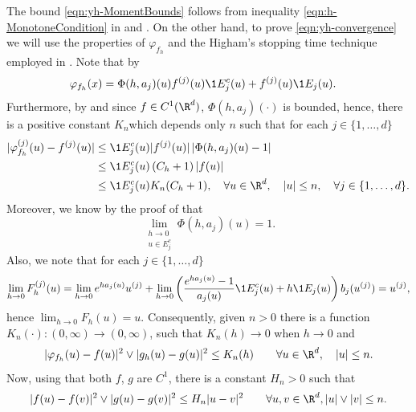 \documentclass[sort&compress, preprint]{elsarticle}
\theoremstyle{definition}
\theoremstyle{plain}%
\theoremstyle{remark}
\begin{document}
\begin{pf}
	The bound \eqref{eqn:yh-MomentBounds} follows from inequality \eqref{eqn:h-MonotoneCondition} in
	 and .
	On the other hand, to prove \eqref{eqn:yh-convergence} we will use the properties of 
	$\varphi_{f_h}$ and the Higham's stopping time technique employed in \cite[Thm 2.2]{Higham2002b}. 
	Note that by  
	\begin{align*}
		\varphi_{f_h}(x) 
			&= \Phi(h,a_j)(u) f^{(j)}(u) \1{E_j^c}(u) 
				+ f^{(j)}(u) \1{E_j}(u).
	\end{align*}
	Furthermore, by   and since $f \in C^1(\R^d)$,   $\Phi(h,a_j)(\cdot)$ is bounded,
	hence, there is a positive constant $K_n$which depends only $n$ such that for each $j\in \{1,\dots, d\}$
	\begin{align*}	
		|\varphi_{f_h}^{(j)}(u) - f^{(j)}(u)|
		&\leq
			\1{E_j^c}(u)
			|f^{(j)}(u)|
			\left|
				\Phi(h,a_j)(u) - 1
			\right| \notag \\
		&\leq
			\1{E_j^c}(u)
			\left(
				C_h + 1
			\right)
			|f(u)|	 \notag \\
		&\leq
		\1{E_j^c}(u) K_n(C_h+1), \quad \forall u \in \R^d, \quad |u|\leq n,  \quad \forall j\in \{1,\dots, d\}.
	\end{align*}
	Moreover, we know by the proof of  that
	\begin{equation*}
	 \lim_{
	 	\substack{
		 	h\to 0 \\
		 	u\in E_j^c	
	 	}
	 }
	 \Phi(h,a_j)(u) = 1.	 	
	\end{equation*}
	Also, we note that for each $j \in \{1, \dots , d\}$
	\begin{equation*}
	\lim_{h \to 0} F_h^{(j)}(u)
		=
		\lim_{h \to 0}
			e^{ha_j(u)} u^{(j)} + 
		\lim_{h \to 0}
			\left(
				\frac{e^{ha_j(u)}-1}{a_j(u)}
				\1{E_j^c}(u)
				+h \1{E_j}(u)
			\right)
			b_j(u^{(j)}) 
		= u^{(j)},
	\end{equation*}
	hence
	$%
		\displaystyle
		\lim_{h\to 0} F_h(u)=u.
	$ %
	Consequently, given $n>0$ there is  a function $K_n(\cdot):(0,\infty)\to (0,\infty)$, such that
	$K_n(h)\to 0$ when $h \to 0$ and
	\begin{equation}\label{eqn:PhihGhKRhBound}
		|\varphi_{f_h}(u)-f(u)|^2 \vee |g_h(u)-g(u)|^2
		\leq K_n(h) \qquad \forall u\in \R^d, \quad |u| \leq n.
	\end{equation}
	Now, using that both $f$, $g$ are $C^{1}$, there is  a constant $H_n>0$ such that
	\begin{equation}\label{eqn:f-gHRBound}
		|f(u)-f(v)|^2 \vee |g(u)-g(v)|^2
		\leq H_n |u-v|^2\qquad \forall u,v \in \R^d, |u|\vee |v| \leq n.
	\end{equation}
	

\end{pf}
\end{document}
